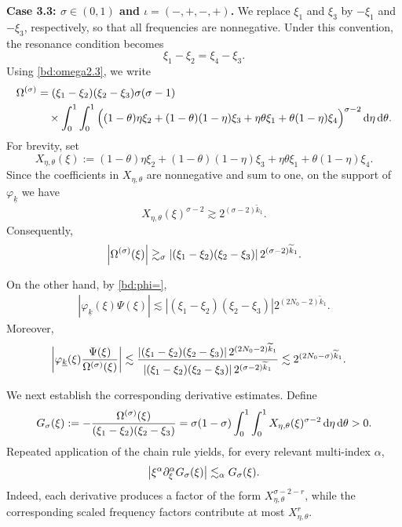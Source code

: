 \documentclass[UTF-8,reqno]{amsart}
\numberwithin{equation}{section}
\theoremstyle{definition}
\def\dif{{\mathord{{\rm d}}}}
\def\dif{{\mathord{{\rm d}}}}
\begin{document}
\textbf{Case 3.3: $\sigma\in(0,1)$ and
$\iota=(-,+,-,+)$.}
We replace $\xi_1$ and $\xi_3$ by $-\xi_1$ and $-\xi_3$,
respectively, so that all frequencies are nonnegative.
Under this convention, the resonance condition becomes
\[
    \xi_1-\xi_2=\xi_4-\xi_3.
\]
Using \eqref{bd:omega2.3}, we write
\begin{align}
\Omega^{(\sigma)}
&=
(\xi_1-\xi_2)(\xi_2-\xi_3)\sigma(\sigma-1)
\notag\\
&\quad\times
\int_0^1\int_0^1
\Big(
    (1-\theta)\eta\xi_2
    +(1-\theta)(1-\eta)\xi_3
    +\eta\theta\xi_1
    +\theta(1-\eta)\xi_4
\Big)^{\sigma-2}
\,\dif\eta\,\dif\theta.\notag
\end{align}
For brevity, set
\[
X_{\eta,\theta}(\xi)
:=
(1-\theta)\eta\xi_2
+(1-\theta)(1-\eta)\xi_3
+\eta\theta\xi_1
+\theta(1-\eta)\xi_4.
\]
Since the coefficients in $X_{\eta,\theta}$ are nonnegative and sum
to one, on the support of $\varphi_{\underline k}$ we have 
\[
    X_{\eta,\theta}(\xi)^{\sigma-2}
    \gtrsim
    2^{(\sigma-2)\widetilde k_1}.
\]
Consequently,
\begin{align}
\left|\Omega^{(\sigma)}(\xi)\right|
\gtrsim_\sigma
\left|
(\xi_1-\xi_2)(\xi_2-\xi_3)
\right|
2^{(\sigma-2)\widetilde{k}_1}.\notag
\end{align}

On the other hand, by \eqref{bd:phi=},
\begin{align*}
\left|
\varphi_{\underline{k}}(\xi)\Psi(\xi)
\right|
\lesssim
\left|
(\xi_1-\xi_2)(\xi_2-\xi_3)
\right|
2^{(2N_0-2)\widetilde{k}_1}.
\end{align*}  Moreover,
\begin{align}
\left|
\varphi_{\underline{k}}(\xi)
\frac{\Psi(\xi)}{\Omega^{(\sigma)}(\xi)}
\right|
&\lesssim
\frac{
\left|
(\xi_1-\xi_2)(\xi_2-\xi_3)
\right|
2^{(2N_0-2)\widetilde{k}_1}
}{
\left|
(\xi_1-\xi_2)(\xi_2-\xi_3)
\right|
2^{(\sigma-2)\widetilde{k}_1}
} \lesssim
2^{(2N_0-\sigma)\widetilde{k}_1}.\notag
\end{align}

We next establish the corresponding derivative estimates. Define
\begin{align*}
G_\sigma(\xi)
:=
-\frac{\Omega^{(\sigma)}(\xi)}
{(\xi_1-\xi_2)(\xi_2-\xi_3)} 
=
\sigma(1-\sigma)
\int_0^1\int_0^1
X_{\eta,\theta}(\xi)^{\sigma-2}
\,\dif\eta\,\dif\theta
>0.
\end{align*} Repeated application of the chain rule yields, for
every relevant multi-index $\alpha$,
\begin{align}
\left|
\xi^\alpha\partial_\xi^\alpha
G_\sigma(\xi)
\right|
\lesssim_\alpha
G_\sigma(\xi).\notag
\end{align}
Indeed, each derivative produces a factor of the form
$X_{\eta,\theta}^{\sigma-2-r}$, while the corresponding scaled
frequency factors contribute at most $X_{\eta,\theta}^r$.
\end{document}
